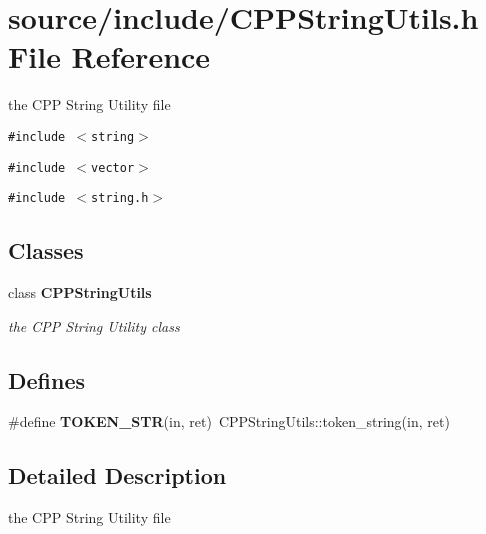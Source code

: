 \section{source/include/CPPStringUtils.h File Reference}
\label{CPPStringUtils_8h}
the CPP String Utility file  


{\tt \#include $<$string$>$}\par
{\tt \#include $<$vector$>$}\par
{\tt \#include $<$string.h$>$}\par
\subsection*{Classes}
\begin{CompactItemize}
\item 
class {\bf CPPStringUtils}
\begin{CompactList}\small\item\em the CPP String Utility class \item\end{CompactList}\end{CompactItemize}
\subsection*{Defines}
\begin{CompactItemize}
\item 
\#define \textbf{TOKEN\_\-STR}(in, ret)~CPPStringUtils::token\_\-string(in, ret)\label{CPPStringUtils_8h_0c4bf3840f8463665e3d39163a903a37}

\end{CompactItemize}


\subsection{Detailed Description}
the CPP String Utility file 

